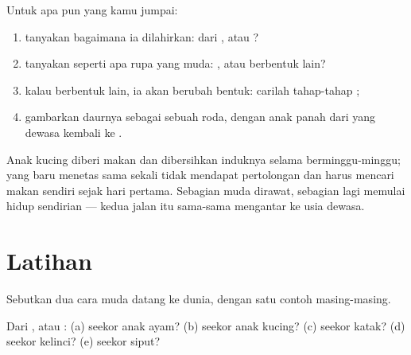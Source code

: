 \begin{method}\label{met:g2:animals-grow-up:read}
Untuk  apa pun yang kamu jumpai:
\begin{enumerate}
  \item tanyakan bagaimana ia dilahirkan: dari , atau ?
  \item tanyakan seperti apa rupa yang muda: ,
        atau berbentuk lain?
  \item kalau berbentuk lain, ia akan berubah bentuk: carilah
        tahap-tahap ;
  \item gambarkan daurnya sebagai sebuah roda, dengan anak panah dari
        yang dewasa kembali ke .
\end{enumerate}
\end{method}

\begin{remark}\label{rem:g2:animals-grow-up:care}
Anak kucing diberi makan dan dibersihkan induknya selama
berminggu-minggu;  yang baru menetas sama sekali tidak mendapat
pertolongan dan harus mencari makan sendiri sejak hari pertama.
Sebagian  muda dirawat, sebagian lagi memulai hidup sendirian ---
kedua jalan itu sama-sama mengantar ke usia dewasa.
\end{remark}

\section{Latihan}

\begin{exercise}[$\star$]\label{exo:g2:animals-grow-up:1}
Sebutkan dua cara  muda datang ke dunia, dengan satu contoh
masing-masing.
\end{exercise}

\begin{exercise}[$\star$]\label{exo:g2:animals-grow-up:2}
Dari , atau : (a) seekor anak ayam? (b) seekor anak
kucing? (c) seekor katak? (d) seekor kelinci? (e) seekor siput?
\end{exercise}

